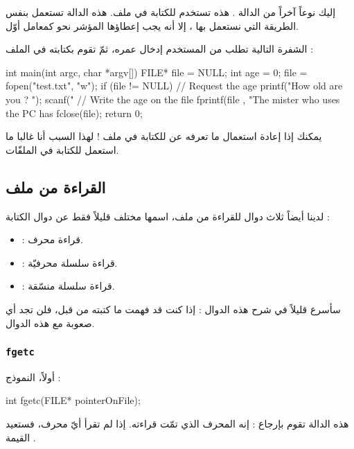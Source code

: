 إليك نوعاً آخراً من الدالة
.
هذه تستخدم للكتابة في ملف. هذه الدالة تستعمل بنفس الطريقة التي نستعمل بها
،
إلا أنه يجب إعطاؤها المؤشر نحو
كمعامل أوّل.

الشفرة التالية تطلب من المستخدم إدخال عمره، ثمّ تقوم بكتابته في الملف :

\begin{Csource}
int main(int argc, char *argv[])
{
	FILE* file = NULL;
	int age = 0;
	file = fopen("test.txt", "w");
	if (file != NULL)
	{
    		// Request the age
    		printf("How old are you ? ");
    		scanf("%
    		// Write the age on the file
    		fprintf(file , "The mister who uses the PC has %
    		fclose(file);
	}
 	return 0;
 }
\end{Csource}


يمكنك إذا إعادة استعمال ما تعرفه عن
للكتابة في ملف ! لهذا السبب أنا غالبا ما استعمل
للكتابة في الملفّات.

\subsection{القراءة من ملف}

لدينا أيضاً ثلاث دوال للقراءة من ملف، اسمها مختلف قليلاً فقط عن دوال الكتابة :

\begin{itemize}
  \item {} :
 قراءة محرف.
  \item {} :
قراءة سلسلة محرفيّة.
  \item {} :
قراءة سلسلة منسّقة.
\end{itemize}

سأسرع قليلاً في شرح هذه الدوال : إذا كنت قد فهمت ما كتبته من قبل، فلن تجد أي صعوبة مع هذه الدوال.

\subsubsection{\texttt{fgetc}}
أولاً، النموذج :

\begin{Csource}
int fgetc(FILE* pointerOnFile);
\end{Csource}

هذه الدالة تقوم بإرجاع
 :
إنه المحرف الذي تمّت قراءته.
إذا لم تقرأ أيّ محرف، فستعيد القيمة
.

